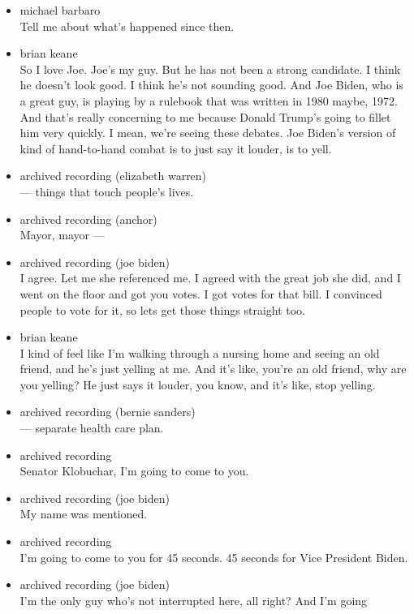 \begin{itemize}
\item
  michael barbaro\\
  Tell me about what's happened since then.
\item
  brian keane\\
  So I love Joe. Joe's my guy. But he has not been a strong candidate. I
  think he doesn't look good. I think he's not sounding good. And Joe
  Biden, who is a great guy, is playing by a rulebook that was written
  in 1980 maybe, 1972. And that's really concerning to me because Donald
  Trump's going to fillet him very quickly. I mean, we're seeing these
  debates. Joe Biden's version of kind of hand-to-hand combat is to just
  say it louder, is to yell.
\item
  archived recording (elizabeth warren)\\
  --- things that touch people's lives.
\item
  archived recording (anchor)\\
  Mayor, mayor ---
\item
  archived recording (joe biden)\\
  I agree. Let me she referenced me. I agreed with the great job she
  did, and I went on the floor and got you votes. I got votes for that
  bill. I convinced people to vote for it, so lets get those things
  straight too.
\item
  brian keane\\
  I kind of feel like I'm walking through a nursing home and seeing an
  old friend, and he's just yelling at me. And it's like, you're an old
  friend, why are you yelling? He just says it louder, you know, and
  it's like, stop yelling.
\item
  archived recording (bernie sanders)\\
  --- separate health care plan.
\item
  archived recording\\
  Senator Klobuchar, I'm going to come to you.
\item
  archived recording (joe biden)\\
  My name was mentioned.
\item
  archived recording\\
  I'm going to come to you for 45 seconds. 45 seconds for Vice President
  Biden.
\item
  archived recording (joe biden)\\
  I'm the only guy who's not interrupted here, all right? And I'm going

\end{itemize}
